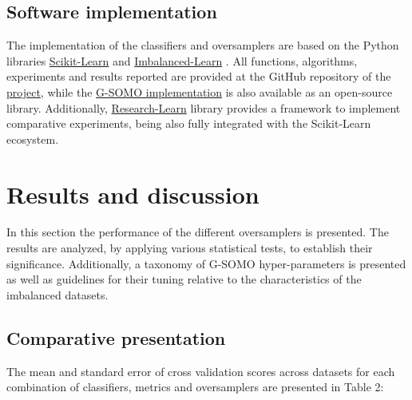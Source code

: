 \documentclass[parskip=full]{scrartcl}
\begin{document}
\subsection{Software implementation}

The implementation of the classifiers and oversamplers are based on the Python libraries \href{https://scikit-learn.org/stable/}{Scikit-Learn} \cite{Pedregosa2012} and \href{https://imbalanced-learn.org/en/stable/}{Imbalanced-Learn} \cite{Lemaitre2016}. All functions, algorithms, experiments and results reported are provided at the GitHub repository of the \href{https://github.com/AlgoWit/publications/tree/master/gsomo}{project}, while the \href{https://github.com/AlgoWit/cluster-over-sampling}{ G-SOMO implementation} is also available as an open-source library. Additionally, \href{https://research-learn.readthedocs.io/en/latest/?badge=latest}{Research-Learn} library provides a framework to implement comparative experiments, being also fully integrated with the Scikit-Learn ecosystem.

\section{Results and discussion}

In this section the performance of the different oversamplers is presented. The results are analyzed, by applying various statistical tests, to establish their significance. Additionally, a taxonomy of G-SOMO hyper-parameters is presented as well as guidelines for their tuning relative to the characteristics of the imbalanced datasets.

\subsection{Comparative presentation}

The mean and standard error of cross validation scores across datasets for each combination of classifiers, metrics and oversamplers are presented in Table 2:

\end{document}
